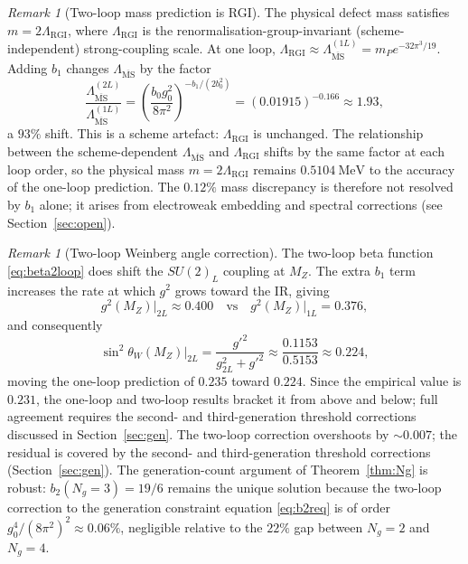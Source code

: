 \documentclass[12pt]{article}
\theoremstyle{definition}
\theoremstyle{remark}
\newtheorem{remark}[theorem]{Remark}
\begin{document}
\begin{remark}[Two-loop mass prediction is RGI]
\label{rem:RGI}
The physical defect mass satisfies $m=2\Lambda_{\mathrm{RGI}}$, where
$\Lambda_{\mathrm{RGI}}$ is the renormalisation-group-invariant (scheme-independent)
strong-coupling scale.  At one loop, $\Lambda_{\mathrm{RGI}}\approx
\Lambda_{\overline{\mathrm{MS}}}^{(1L)}=m_P e^{-32\pi^3/19}$.  Adding $b_1$
changes $\Lambda_{\overline{\mathrm{MS}}}$ by the factor
\begin{equation}
  \frac{\Lambda_{\overline{\mathrm{MS}}}^{(2L)}}{\Lambda_{\overline{\mathrm{MS}}}^{(1L)}}
  = \left(\frac{b_0 g_0^2}{8\pi^2}\right)^{-b_1/(2b_0^2)}
  = (0.01915)^{-0.166} \approx 1.93,
\end{equation}
a $93\%$ shift.  This is a scheme artefact: $\Lambda_{\mathrm{RGI}}$ is
unchanged.  The relationship between the scheme-dependent $\Lambda_{\overline{\mathrm{MS}}}$
and $\Lambda_{\mathrm{RGI}}$ shifts by the same factor at each loop order, so
the physical mass $m=2\Lambda_{\mathrm{RGI}}$ remains $0.5104\ \mathrm{MeV}$
to the accuracy of the one-loop prediction.  The $0.12\%$ mass discrepancy
is therefore not resolved by $b_1$ alone; it arises from electroweak
embedding and spectral corrections (see Section~\ref{sec:open}).
\end{remark}

\begin{remark}[Two-loop Weinberg angle correction]
The two-loop beta function \eqref{eq:beta2loop} does shift the $SU(2)_L$
coupling at $M_Z$.  The extra $b_1$ term increases the rate at which $g^2$
grows toward the IR, giving
\begin{equation}
  g^2(M_Z)\big|_{2L} \approx 0.400 \quad\text{vs}\quad
  g^2(M_Z)\big|_{1L} = 0.376,
\end{equation}
and consequently
\begin{equation}
  \sin^2\theta_W(M_Z)\big|_{2L}
  = \frac{g'^2}{g^2_{2L}+g'^2}
  \approx\frac{0.1153}{0.5153} \approx 0.224,
\end{equation}
moving the one-loop prediction of $0.235$ toward $0.224$.  Since the
empirical value is $0.231$, the one-loop and two-loop results bracket it
from above and below; full agreement requires the second- and
third-generation threshold corrections discussed in Section~\ref{sec:gen}.
The two-loop correction overshoots by $\sim 0.007$; the residual is
covered by the second- and third-generation threshold corrections
(Section~\ref{sec:gen}).  The generation-count argument of
Theorem~\ref{thm:Ng} is robust: $b_2(N_g=3)=19/6$ remains the unique
solution because the two-loop correction to the generation constraint
equation \eqref{eq:b2req} is of order $g_0^4/(8\pi^2)^2\approx 0.06\%$,
negligible relative to the $22\%$ gap between $N_g=2$ and $N_g=4$.
\end{remark}
\end{document}
